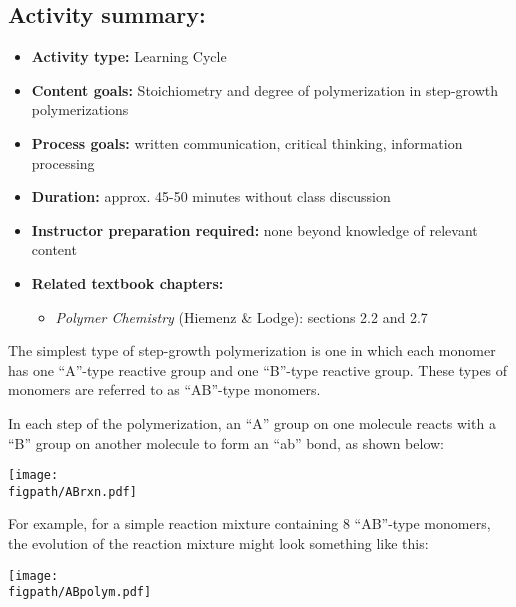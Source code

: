 \begin{activity}
\begin{instructornotes}
	\subsection*{Activity summary:}
	\begin{itemize}
		\item \textbf{Activity type:} Learning Cycle
		\item \textbf{Content goals:} Stoichiometry and degree of polymerization in step-growth polymerizations
		\item \textbf{Process goals:} %
			written communication, critical thinking, information processing
		\item \textbf{Duration:} approx. 45-50 minutes without class discussion
		\item \textbf{Instructor preparation required:} none beyond knowledge of relevant content
		\item \textbf{Related textbook chapters:}
			\begin{itemize}
				\item \emph{Polymer Chemistry} (Hiemenz \& Lodge): sections 2.2 and 2.7
			\end{itemize}
	\end{itemize}

\end{instructornotes}


\begin{model}

The simplest type of step-growth polymerization is one in which each monomer has one ``A''-type reactive group and one ``B''-type reactive group.
These types of monomers are referred to as ``AB''-type monomers.

In each step of the polymerization, an ``A'' group on one molecule reacts with a ``B'' group on another molecule to form an ``ab'' bond, as shown below:

\vspace{0.1in}
\centerline{\texttt{[image: \\figpath/ABrxn.pdf]}}

For example, for a simple reaction mixture containing 8 ``AB''-type monomers, the evolution of the reaction mixture might look something like this:

\vspace{0.1in}
\centerline{\texttt{[image: \\figpath/ABpolym.pdf]}}


\end{model}
\end{activity}
